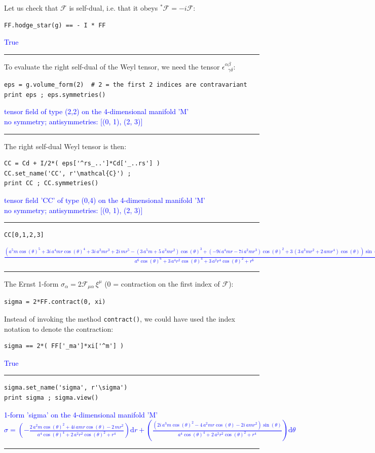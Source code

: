 \documentclass[a4paper]{jpconf}
\newcommand{\code}[1]{\texttt{#1}}
\newcommand{\w}[1]{\bm{#1}}
\newcommand{\soutput}[1]{\textcolor{blue}{#1}\\[-0.8ex]\rule{\textwidth}{0.4pt}}
\begin{document}
Let us check that $\w{\mathcal{F}}$ is self-dual, i.e. that it obeys
${}^* \w{\mathcal{F}} = -i \w{\mathcal{F}}$:
\begin{verbatim}
FF.hodge_star(g) == - I * FF
\end{verbatim}
\soutput{True}
To evaluate the right self-dual of the Weyl tensor, we need the 
tensor $\epsilon^{\alpha\beta}_{\ \ \ \gamma\delta}$:
\begin{verbatim}
eps = g.volume_form(2)  # 2 = the first 2 indices are contravariant
print eps ; eps.symmetries()
\end{verbatim}
\soutput{tensor field of type (2,2) on the 4-dimensional manifold 'M'\\
no symmetry;  antisymmetries: [(0, 1), (2, 3)]}
The right self-dual Weyl tensor is then:
\begin{verbatim}
CC = Cd + I/2*( eps['^rs_..']*Cd['_..rs'] )
CC.set_name('CC', r'\mathcal{C}') ; 
print CC ; CC.symmetries()
\end{verbatim}
\soutput{tensor field 'CC' of type (0,4) on the 4-dimensional manifold 'M'\\
no symmetry;  antisymmetries: [(0, 1), (2, 3)]}
\begin{verbatim}
CC[0,1,2,3]
\end{verbatim}
\soutput{$\frac{{\left(a^{5} m \cos\left(\theta\right)^{5} + 3 i \, a^{4} m r
\cos\left(\theta\right)^{4} + 3 i \, a^{2} m r^{3} + 2 i \, m r^{5} -
{\left(3 \, a^{5} m + 5 \, a^{3} m r^{2}\right)}
\cos\left(\theta\right)^{3} + {\left(-9 i \, a^{4} m r - 7 i \, a^{2} m
r^{3}\right)} \cos\left(\theta\right)^{2} + 3 \, {\left(3 \, a^{3} m
r^{2} + 2 \, a m r^{4}\right)} \cos\left(\theta\right)\right)}
\sin\left(\theta\right)}{a^{6} \cos\left(\theta\right)^{6} + 3 \, a^{4}
r^{2} \cos\left(\theta\right)^{4} + 3 \, a^{2} r^{4}
\cos\left(\theta\right)^{2} + r^{6}}$}
The Ernst 1-form $\sigma_\alpha = 2 \mathcal{F}_{\mu\alpha} \, \xi^\mu$ (0 = contraction on the first index of $\w{\mathcal{F}}$):
\begin{verbatim}
sigma = 2*FF.contract(0, xi)
\end{verbatim}
Instead of invoking the method \code{contract()}, 
we could have used the index notation to denote the contraction:
\begin{verbatim}
sigma == 2*( FF['_ma']*xi['^m'] )
\end{verbatim}
\soutput{True}
\begin{verbatim}
sigma.set_name('sigma', r'\sigma')
print sigma ; sigma.view()
\end{verbatim}
\soutput{1-form 'sigma' on the 4-dimensional manifold 'M'\\
$\sigma = \left( -\frac{2 \, a^{2} m \cos\left(\theta\right)^{2} + 4 i \,
a m r \cos\left(\theta\right) - 2 \, m r^{2}}{a^{4}
\cos\left(\theta\right)^{4} + 2 \, a^{2} r^{2}
\cos\left(\theta\right)^{2} + r^{4}} \right) \mathrm{d} r + \left(
\frac{{\left(2 i \, a^{3} m \cos\left(\theta\right)^{2} - 4 \, a^{2} m r
\cos\left(\theta\right) - 2 i \, a m r^{2}\right)}
\sin\left(\theta\right)}{a^{4} \cos\left(\theta\right)^{4} + 2 \, a^{2}
r^{2} \cos\left(\theta\right)^{2} + r^{4}} \right) \mathrm{d} \theta$}
\end{document}
